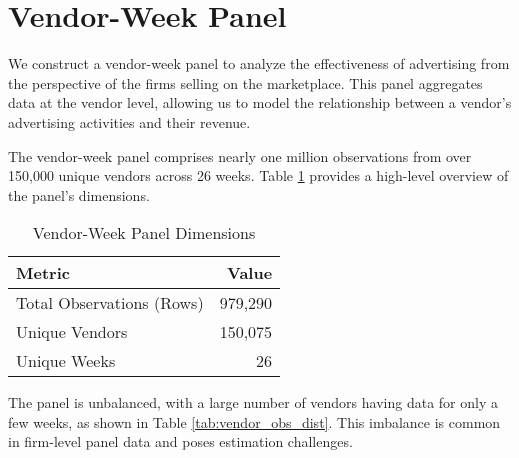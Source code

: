 \section*{Vendor-Week Panel}

We construct a vendor-week panel to analyze the effectiveness of advertising from the perspective of the firms selling on the marketplace. This panel aggregates data at the vendor level, allowing us to model the relationship between a vendor's advertising activities and their revenue.

The vendor-week panel comprises nearly one million observations from over 150,000 unique vendors across 26 weeks. Table \ref{tab:vendor_panel_dims} provides a high-level overview of the panel's dimensions.

\begin{table}[htbp!]
\centering
\caption{Vendor-Week Panel Dimensions}
\label{tab:vendor_panel_dims}
\begin{tabular}{lr}
\toprule
Metric & Value \\
\midrule
Total Observations (Rows) & 979,290 \\
Unique Vendors & 150,075 \\
Unique Weeks & 26 \\
\bottomrule
\end{tabular}
\end{table}

The panel is unbalanced, with a large number of vendors having data for only a few weeks, as shown in Table \ref{tab:vendor_obs_dist}. This imbalance is common in firm-level panel data and poses estimation challenges.


